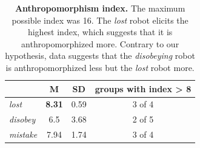 \documentclass{sig-alternate}
\begin{document}
\begin{table}[ht!]
    \centering
    \footnotesize
    \begin{tabular}{lccc}
        \toprule
        & M & SD & groups with index > 8 \\
        \midrule

        \textit{lost} & \textbf{8.31} & 0.59 & 3 of 4 \\ 
        \textit{disobey} & 6.5 & 3.68 & 2 of 5 \\
        \textit{mistake} & 7.94 & 1.74 & 3 of 4 \\ 
        \bottomrule
    \end{tabular}
    \caption{\textbf{Anthropomorphism index.} The maximum possible index was 16. The
    \textit{lost} robot elicits the highest index, which suggests that it is
    anthropomorphized more. Contrary to our hypothesis, data suggests that the
    \textit{disobeying} robot is anthropomorphized less but the \textit{lost} robot
    more.}

    \label{tab:domino-anth-score}       %
\end{table}	
\end{document}
